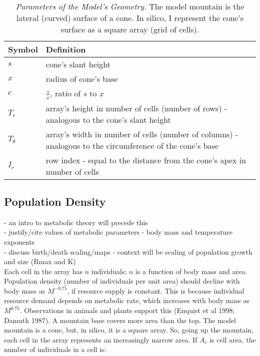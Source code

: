 \documentclass[11pt]{article}
\begin{document}
\begin{table}[p]
\centering
\begin{tabular}{ | m{2cm} | m{10cm} | } 
	\hline
	\textbf{Symbol} & \textbf{Definition} \\
	\hline
	$s$ & cone's slant height \\
	\hline
	$x$ & radius of cone's base \\
	\hline
	$c$ & $\frac{s}{x}$, ratio of $s$ to $x$ \\
	\hline
	$T_r$ & array's height in number of cells (number of rows) - analogous to the cone's slant height \\
	\hline
	$T_\theta$ & array's width in number of cells (number of columns) - analogous to the circumference of the cone's base \\
	\hline
	$I_r$ & row index - equal to the distance from the cone's apex in number of cells \\
	\hline
\end{tabular}
\caption{\emph{Parameters of the Model's Geometry.} The model mountain is the lateral (curved) surface of a cone. In silico, I represent the cone's surface as a square array (grid of cells).}
\end{table}

\subsection{Population Density}
- an intro to metabolic theory will precede this\\
- justify/cite values of metabolic parameters - body mass and temperature exponents\\
- discuss birth/death scaling/maps - context will be scaling of population growth and size (Rmax and K)\\

Each cell in the array has $n$ individuals; $n$ is a function of body mass and area. Population density (number of individuals per unit area) should decline with body mass as $M^{-0.75}$, if resource supply is constant. This is because individual resource demand depends on metabolic rate, which increases with body mass as $M^{0.75}$. Observations in animals and plants support this (Enquist et al 1998; Damuth 1987). A mountain base covers more area than the top. The model mountain is a cone, but, in silico, it is a square array. So, going up the mountain, each cell in the array represents an increasingly narrow area. If $A_c$ is cell area, the number of individuals in a cell is:
\end{document}
